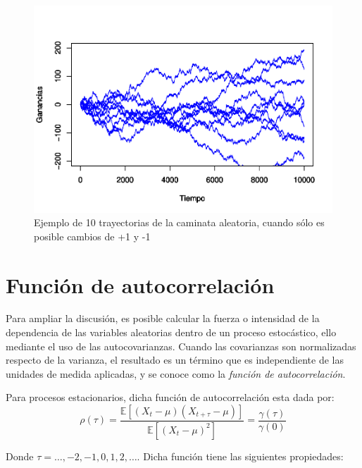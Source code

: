 \documentclass[
]{book}
\begin{document}
\begin{figure}

{\centering \includegraphics{Notas-Series-Tiempo_files/figure-latex/fig31-1} 

}

\caption{Ejemplo de 10 trayectorias de la caminata aleatoria, cuando sólo es posible cambios de +1 y -1}\label{fig:fig31}
\end{figure}

\hypertarget{funciuxf3n-de-autocorrelaciuxf3n}{%
\section{Función de autocorrelación}\label{funciuxf3n-de-autocorrelaciuxf3n}}

Para ampliar la discusión, es posible calcular la fuerza o intensidad de la dependencia de las variables aleatorias dentro de un proceso estocástico, ello mediante el uso de las autocovarianzas. Cuando las covarianzas son normalizadas respecto de la varianza, el resultado es un término que es independiente de las unidades de medida aplicadas, y se conoce como la \emph{función de autocorrelación}.

Para procesos estacionarios, dicha función de autocorrelación esta dada por:
\begin{equation}
    \rho(\tau) = \frac{\mathbb{E}[(X_t - \mu)(X_{t+\tau} - \mu)]}{\mathbb{E}[(X_t - \mu)^2]} = \frac{\gamma(\tau)}{\gamma(0)}
    \label{eq:em5}
\end{equation}

Donde \(\tau = \ldots, -2, -1, 0, 1, 2, \ldots\). Dicha función tiene las siguientes propiedades:
\end{document}
